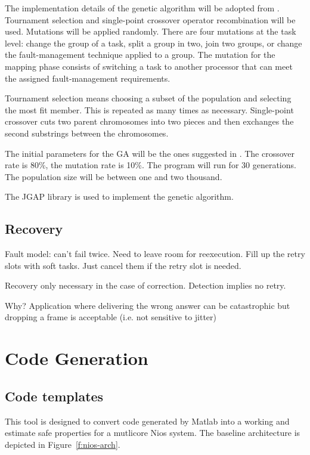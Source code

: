 \documentclass[table,11pt]{article}
\begin{document}
The implementation details of the genetic algorithm will be adopted from \cite{bolchini2013reliability}. Tournament selection and single-point crossover operator recombination will be used. Mutations will be applied randomly. There are four mutations at the task level: change the group of a task, split a group in two, join two groups, or change the fault-management technique applied to a group. The mutation for the mapping phase consists of switching a task to another processor that can meet the assigned fault-management requirements.

Tournament selection means choosing a subset of the population and selecting the most fit member. This is repeated as many times as necessary. Single-point crossover cuts two parent chromosomes into two pieces and then exchanges the second substrings between the chromosomes. 

The initial parameters for the GA will be the ones suggested in \cite{bolchini2010multi}. The crossover rate is 80\%, the mutation rate is 10\%. The program will run for 30 generations. The population size will be between one and two thousand.

The JGAP library \cite{jgap} is used to implement the genetic algorithm. 

\subsection{Recovery}
Fault model: can't fail twice.
Need to leave room for reexecution. 
Fill up the retry slots with soft tasks. Just cancel them if the retry slot is needed.

Recovery only necessary in the case of correction. Detection implies no retry. 

Why? Application where delivering the wrong answer can be catastrophic but dropping a frame is acceptable (i.e. not sensitive to jitter)



\section{Code Generation}

\subsection{Code templates}

This tool is designed to convert code generated by Matlab into a working and estimate safe properties for a mutlicore Nios system. The baseline architecture is depicted in Figure~\ref{f:nios-arch}. 
\end{document}
